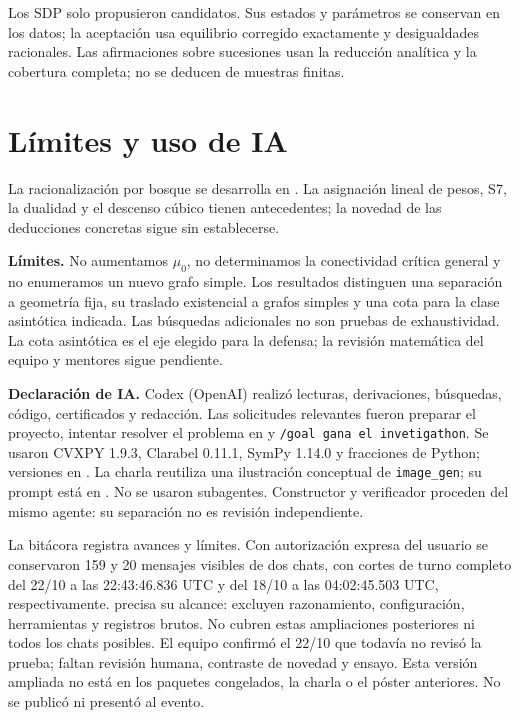 \documentclass[10pt,a4paper]{article}
\newcommand{\muo}{\mu_0}
\begin{document}
Los SDP solo propusieron candidatos. Sus estados y parámetros se conservan en los datos; la aceptación usa equilibrio corregido exactamente y desigualdades racionales. Las afirmaciones sobre sucesiones usan la reducción analítica y la cobertura completa; no se deducen de muestras finitas.

\clearpage
\section{Límites y uso de IA}
La racionalización por bosque se desarrolla en . La asignación lineal de pesos, S7, la dualidad y el descenso cúbico tienen antecedentes; la novedad de las deducciones concretas sigue sin establecerse.

\textbf{Límites.} No aumentamos $\muo$, no determinamos la conectividad crítica general y no enumeramos un nuevo grafo simple. Los resultados distinguen una separación a geometría fija, su traslado existencial a grafos simples y una cota para la clase asintótica indicada. Las búsquedas adicionales no son pruebas de exhaustividad. La cota asintótica es el eje elegido para la defensa; la revisión matemática del equipo y mentores sigue pendiente.

\textbf{Declaración de IA.}
Codex (OpenAI) realizó lecturas, derivaciones, búsquedas, código, certificados y redacción. Las solicitudes relevantes fueron preparar el proyecto, intentar resolver el problema en  y \texttt{/goal gana el invetigathon}. Se usaron CVXPY 1.9.3, Clarabel 0.11.1, SymPy 1.14.0 y fracciones de Python; versiones en . La charla reutiliza una ilustración conceptual de \texttt{image\_gen}; su prompt está en . No se usaron subagentes. Constructor y verificador proceden del mismo agente: su separación no es revisión independiente.

La bitácora registra avances y límites. Con autorización expresa del usuario se conservaron 159 y 20 mensajes visibles de dos chats, con cortes de turno completo del 22/10 a las 22:43:46.836 UTC y del 18/10 a las 04:02:45.503 UTC, respectivamente.  precisa su alcance: excluyen razonamiento, configuración, herramientas y registros brutos. No cubren estas ampliaciones posteriores ni todos los chats posibles. El equipo confirmó el 22/10 que todavía no revisó la prueba; faltan revisión humana, contraste de novedad y ensayo. Esta versión ampliada no está en los paquetes congelados, la charla o el póster anteriores. No se publicó ni presentó al evento.
\end{document}
